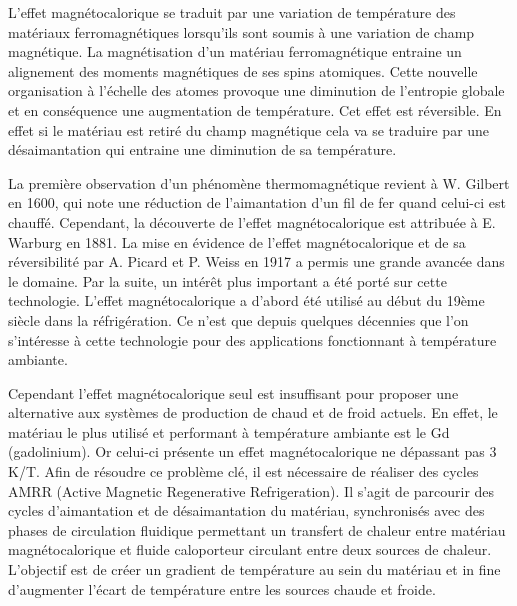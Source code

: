 {\normalsize
L'effet magnétocalorique se traduit par une variation de température des matériaux ferromagnétiques lorsqu'ils sont soumis à une variation de champ magnétique. La magnétisation d'un matériau ferromagnétique entraine un alignement des moments magnétiques de ses spins atomiques. Cette nouvelle organisation à l'échelle des atomes provoque une diminution de l'entropie globale et en conséquence une augmentation de température. Cet effet est réversible. En effet si le matériau est retiré du champ magnétique cela va se traduire par une désaimantation qui entraine une diminution de sa température.







La première observation d'un phénomène thermomagnétique revient à W. Gilbert en 1600, qui note une réduction de l'aimantation d'un fil de fer quand celui-ci est chauffé. Cependant, la découverte de l'effet magnétocalorique est attribuée à E. Warburg en 1881. La mise en évidence de l'effet magnétocalorique et de sa réversibilité par A. Picard et P. Weiss en 1917 a permis une grande avancée dans le domaine. Par la suite, un intérêt plus important a été porté sur cette technologie. L'effet magnétocalorique a d'abord été utilisé au début du 19ème siècle dans la réfrigération. Ce n'est que depuis quelques décennies que l'on s'intéresse à cette technologie pour des applications fonctionnant à température ambiante.







Cependant l'effet magnétocalorique seul est insuffisant pour proposer une alternative aux systèmes de production de chaud et de froid actuels. En effet, le matériau le plus utilisé et performant à température ambiante est le Gd (gadolinium). Or celui-ci présente un effet magnétocalorique ne dépassant pas 3 K/T. Afin de résoudre ce problème clé, il est nécessaire de réaliser des cycles AMRR (Active Magnetic Regenerative Refrigeration). Il s'agit de parcourir des cycles d'aimantation et de désaimantation du matériau, synchronisés avec des phases de circulation fluidique permettant un transfert de chaleur entre matériau magnétocalorique et fluide caloporteur circulant entre deux sources de chaleur. L'objectif est de créer un gradient de température au sein du matériau et in fine d'augmenter l'écart de température entre les sources chaude et froide. 







}
